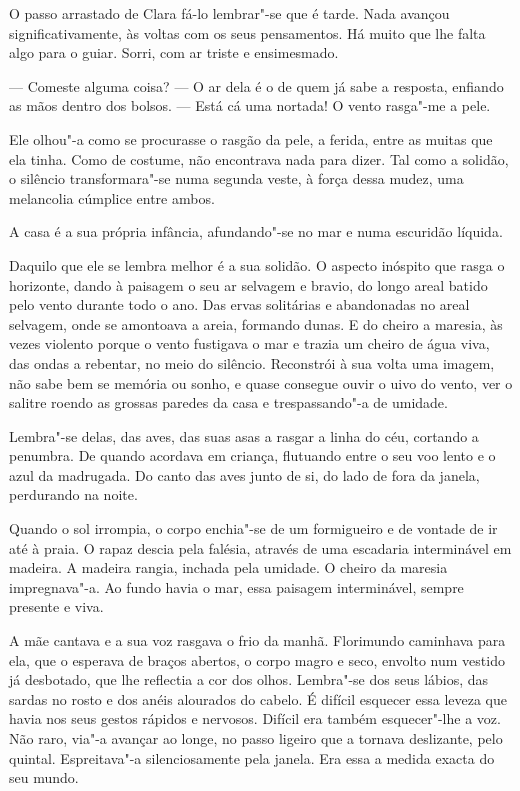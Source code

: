 O passo arrastado de Clara fá-lo lembrar"-se que é tarde. Nada avançou
significativamente, às voltas com os seus pensamentos. Há muito que lhe
falta algo para o guiar. Sorri, com ar triste e ensimesmado.

--- Comeste alguma coisa? --- O ar dela é o de quem já sabe a resposta,
enfiando as mãos dentro dos bolsos. --- Está cá uma nortada! O vento
rasga"-me a pele.

Ele olhou"-a como se procurasse o rasgão da pele, a ferida, entre as
muitas que ela tinha. Como de costume, não encontrava nada para dizer.
Tal como a solidão, o silêncio transformara"-se numa segunda veste, à
força dessa mudez, uma melancolia cúmplice entre ambos.

A casa é a sua própria infância, afundando"-se no mar e numa escuridão
líquida.

Daquilo que ele se lembra melhor é a sua solidão. O aspecto inóspito que
rasga o horizonte, dando à paisagem o seu ar selvagem e bravio, do longo
areal batido pelo vento durante todo o ano. Das ervas solitárias e
abandonadas no areal selvagem, onde se amontoava a areia, formando
dunas. E do cheiro a maresia, às vezes violento porque o vento fustigava
o mar e trazia um cheiro de água viva, das ondas a rebentar, no meio do
silêncio. Reconstrói à sua volta uma imagem, não sabe bem se memória ou
sonho, e quase consegue ouvir o uivo do vento, ver o salitre roendo as
grossas paredes da casa e trespassando"-a de umidade.

Lembra"-se delas, das aves, das suas asas a rasgar a linha do céu,
cortando a penumbra. De quando acordava em criança, flutuando entre o
seu voo lento e o azul da madrugada. Do canto das aves junto de si, do
lado de fora da janela, perdurando na noite.

Quando o sol irrompia, o corpo enchia"-se de um formigueiro e de vontade
de ir até à praia. O rapaz descia pela falésia, através de uma escadaria
interminável em madeira. A madeira rangia, inchada pela umidade. O
cheiro da maresia impregnava"-a. Ao fundo havia o mar, essa paisagem
interminável, sempre presente e viva.

A mãe cantava e a sua voz rasgava o frio da manhã. Florimundo caminhava
para ela, que o esperava de braços abertos, o corpo magro e seco,
envolto num vestido já desbotado, que lhe reflectia a cor dos olhos.
Lembra"-se dos seus lábios, das sardas no rosto e dos anéis alourados do
cabelo. É difícil esquecer essa leveza que havia nos seus gestos rápidos
e nervosos. Difícil era também esquecer"-lhe a voz. Não raro, via"-a
avançar ao longe, no passo ligeiro que a tornava deslizante, pelo
quintal. Espreitava"-a silenciosamente pela janela. Era essa a medida
exacta do seu mundo.

